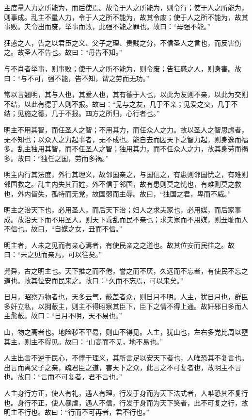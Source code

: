 \documentclass[]{article}
\begin{document}
主度量人力之所能为，而后使焉。故令于人之所能为，则令行；使于人之所能为，则事成。乱主不量人力，令于人之所不能为，故其令废；使于人之所不能为，故其事败。夫令出而废，举事而败，此强不能之罪也。故曰：``毋强不能。''

狂惑之人，告之以君臣之义、父子之理、贵贱之分，不信圣人之言也，而反害伤之。故圣人不告也。故曰：``毋告不知。''

与不肖者举事，则事败；使于人之所不能为，则令废；告狂惑之人，则身害。故曰：``与不可，强不能，告不知，谓之劳而无功。''

常以言翘明，其与人也，其爱人也，其有德于人也，以此为友则不亲，以此为交则不结，以此有德于人则不报。故曰：``见与之友，几于不亲；见爱之交，几于不结；见施之德，几于不报。四方之所归，心行者也。''

明主不用其智，而任圣人之智；不用其力，而任众人之力。故以圣人之智思虑者，无不知也；以众人之力起事者，无不成也。能自去而因天下之智力起，则身逸而福多。乱主独用其智，而不任圣人之智；独用其力，而不任众人之力，故其身劳而祸多。故曰：``独任之国，劳而多祸。''

明主内行其法度，外行其理义，故邻国亲之，与国信之，有患则邻国忧之，有难则邻国救之。乱主内失其百姓，外不信于邻国，故有患则莫之忧也，有难则莫之救也，外内皆失，孤特而无党，故国弱而主辱。故曰，``独国之君，卑而不威。''

明主之治天下也，必用圣人，而后天下治；妇人之求夫家也，必用媒，而后家事成。故治天下而不用圣人，则天下乖乱而民不亲也；求夫家而不用媒，则丑耻而人不信也。故曰，``自媒之女，丑而不信。''

明主者，人未之见而有亲心焉者，有使民亲之之道也。故其位安而民往之。故曰：``未之见而亲焉，可以往矣。''

尧舜，古之明主也。天下推之而不倦，誉之而不厌，久远而不忘者，有使民不忘之道也。故其位安而民来之。故曰：``久而不忘焉，可以来矣。''

日月，昭察万物者也，天多云气，蔽盖者众，则日月不明。人主，犹日月也，群臣多奸立私，以拥蔽主，则主不得昭察其臣下，臣下之情不得上通。故奸邪日多而人主愈蔽。故曰：``日月不明，天不易也。''

山，物之高者也。地险秽不平易，则山不得见。人主，犹山也，左右多党比周以壅其主，则主不得见。故曰：``山高而不见，地不易也。''

人主出言不逆于民心，不悖于理义，其所言足以安天下者也，人唯恐其不复言也。出言而离父子之亲，疏君臣之道，害天下之众，此言之不可复者也，故明主不言也。故曰：``言而不可复者，君不言也。''

人主身行方正，使人有礼，遇人有理，行发于身而为天下法式者，人唯恐其不复行也。身行不正，使人暴虐，遇人不信，行发于身而为天下笑者，此不可复之行，故明主不行也。故曰：``行而不可再者，君不行也。''
\end{document}
